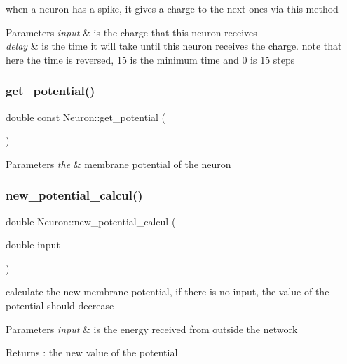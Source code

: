 when a neuron has a spike, it gives a charge to the next ones via this method 
\begin{DoxyParams}{Parameters}
{\em input} & is the charge that this neuron receives \\
\hline
{\em delay} & is the time it will take until this neuron receives the charge. note that here the time is reversed, 15 is the minimum time and 0 is 15 steps \\
\hline
\end{DoxyParams}
\mbox{\label{class_neuron_a96dcaec2f9146dedd3f926d35b2c08f4}} 
\subsubsection{\texorpdfstring{get\+\_\+potential()}{get\_potential()}}
{\footnotesize\ttfamily double const Neuron\+::get\+\_\+potential (\begin{DoxyParamCaption}{ }\end{DoxyParamCaption})}


\begin{DoxyParams}{Parameters}
{\em the} & membrane potential of the neuron \\
\hline
\end{DoxyParams}
\mbox{\label{class_neuron_a689b33332f090aab40360f53c8bcfac6}} 
\subsubsection{\texorpdfstring{new\+\_\+potential\+\_\+calcul()}{new\_potential\_calcul()}}
{\footnotesize\ttfamily double Neuron\+::new\+\_\+potential\+\_\+calcul (\begin{DoxyParamCaption}\item[{double}]{input }\end{DoxyParamCaption})}

calculate the new membrane potential, if there is no input, the value of the potential should decrease 
\begin{DoxyParams}{Parameters}
{\em input} & is the energy received from outside the network \\
\hline
\end{DoxyParams}
\begin{DoxyReturn}{Returns}
\+: the new value of the potential 
\end{DoxyReturn}
\mbox{\label{class_neuron_abad446d547800d3ba15a2da374fe409e}} 
